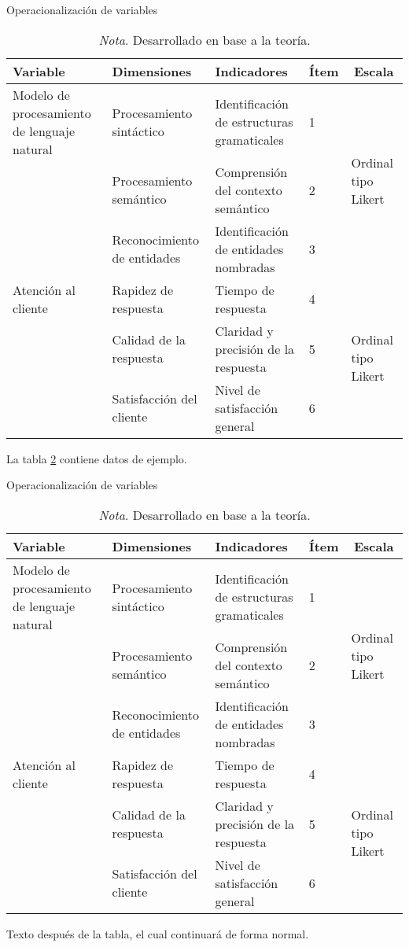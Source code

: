 \begin{table}[H] %
\centering
\caption{Operacionalización de variables}
\label{tab:operacionalizacion}
\begin{tabular}{p{3.2cm} p{3cm} p{3.5cm} p{1cm} p{3cm}} %
\toprule
\textbf{Variable} & \textbf{Dimensiones} & \textbf{Indicadores} & \textbf{Ítem} & \multicolumn{1}{c}{\textbf{Escala}} \\
\midrule
Modelo de procesamiento de lenguaje natural & Procesamiento sintáctico & Identificación de estructuras gramaticales & 1 & \multirow{3}{*}{Ordinal tipo Likert} \\
 & Procesamiento semántico & Comprensión del contexto semántico & 2 & \\
 & Reconocimiento de entidades & Identificación de entidades nombradas & 3 & \\
\midrule
Atención al cliente & Rapidez de respuesta & Tiempo de respuesta & 4 & \multirow{3}{*}{Ordinal tipo Likert} \\
 & Calidad de la respuesta & Claridad y precisión de la respuesta & 5 & \\
 & Satisfacción del cliente & Nivel de satisfacción general & 6 & \\
\bottomrule
\end{tabular}
\caption*{\textit{Nota}. \normalfont Desarrollado en base a la teoría.}
\end{table}

La tabla \ref{tab:operacionalizacion2} contiene datos de ejemplo.

\begin{table}[H] %
\centering
\caption{Operacionalización de variables}
\label{tab:operacionalizacion2}
\begin{tabular}{|p{3.2cm}|p{3cm}|p{3.5cm}|p{1cm}|p{3cm}|}
\hline
\textbf{Variable} & \textbf{Dimensiones} & \textbf{Indicadores} & \textbf{Ítem} & \multicolumn{1}{c|}{\textbf{Escala}} \\
\hline
Modelo de procesamiento de lenguaje natural & Procesamiento sintáctico & Identificación de estructuras gramaticales & 1 & \multirow{3}{*}{Ordinal tipo Likert} \\
 & Procesamiento semántico & Comprensión del contexto semántico & 2 & \\
 & Reconocimiento de entidades & Identificación de entidades nombradas & 3 & \\
\hline
Atención al cliente & Rapidez de respuesta & Tiempo de respuesta & 4 & \multirow{3}{*}{Ordinal tipo Likert} \\
 & Calidad de la respuesta & Claridad y precisión de la respuesta & 5 & \\
 & Satisfacción del cliente & Nivel de satisfacción general & 6 & \\
\hline
\end{tabular}
\caption*{\textit{Nota}. \normalfont Desarrollado en base a la teoría.}
\end{table}

Texto después de la tabla, el cual continuará de forma normal.



